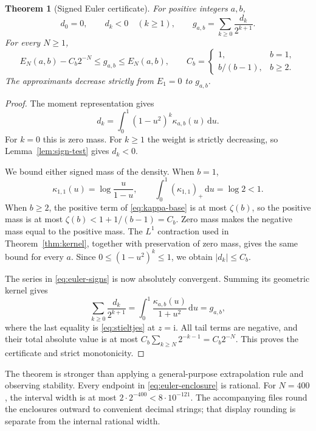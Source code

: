 \documentclass[11pt,a4paper]{article}
\numberwithin{equation}{section}
\newtheorem{theorem}{Theorem}[section]
\theoremstyle{definition}
\theoremstyle{remark}
\newcommand{\dd}{\,\mathrm{d}}
\newcommand{\ii}{\mathrm{i}}
\begin{document}
\begin{theorem}[Signed Euler certificate]\label{thm:euler-certificate}
For positive integers $a,b$,
\begin{equation}\label{eq:euler-signs}
 d_0=0,\qquad d_k<0\quad(k\ge1),\qquad
 g_{a,b}=\sum_{k\ge0}\frac{d_k}{2^{k+1}}.
\end{equation}
For every $N\ge1$,
\begin{equation}\label{eq:euler-enclosure}
 E_N(a,b)-C_b2^{-N}\le g_{a,b}\le E_N(a,b),\qquad
 C_b=\begin{cases}1,&b=1,\\ b/(b-1),&b\ge2.\end{cases}
\end{equation}
The approximants decrease strictly from $E_1=0$ to $g_{a,b}$.
\end{theorem}
\begin{proof}
The moment representation gives
\begin{equation}\label{eq:d-kernel}
 d_k=\int_0^1(1-u^2)^k\kappa_{a,b}(u)\dd u.
\end{equation}
For $k=0$ this is zero mass. For $k\ge1$ the weight is strictly decreasing, so Lemma~\ref{lem:sign-test} gives $d_k<0$.

We bound either signed mass of the density. When $b=1$,
\[
 \kappa_{1,1}(u)=\log\frac{u}{1-u},\qquad
 \int_0^1(\kappa_{1,1})_+\dd u=\log2<1.
\]
When $b\ge2$, the positive term of \eqref{eq:kappa-base} is at most $\zeta(b)$, so the positive mass is at most $\zeta(b)<1+1/(b-1)=C_b$. Zero mass makes the negative mass equal to the positive mass. The $L^1$ contraction used in Theorem~\ref{thm:kernel}, together with preservation of zero mass, gives the same bound for every $a$. Since $0\le(1-u^2)^k\le1$, we obtain $|d_k|\le C_b$.

The series in \eqref{eq:euler-signs} is now absolutely convergent. Summing its geometric kernel gives
\[
 \sum_{k\ge0}\frac{d_k}{2^{k+1}}
 =\int_0^1\frac{\kappa_{a,b}(u)}{1+u^2}\dd u
 =g_{a,b},
\]
where the last equality is \eqref{eq:stieltjes} at $z=\ii$. All tail terms are negative, and their total absolute value is at most $C_b\sum_{k\ge N}2^{-k-1}=C_b2^{-N}$. This proves the certificate and strict monotonicity.
\end{proof}

The theorem is stronger than applying a general-purpose extrapolation rule and observing stability. Every endpoint in \eqref{eq:euler-enclosure} is rational. For $N=400$, the interval width is at most $2\cdot2^{-400}<8\cdot10^{-121}$. The accompanying files round the enclosures outward to convenient decimal strings; that display rounding is separate from the internal rational width.
\end{document}
